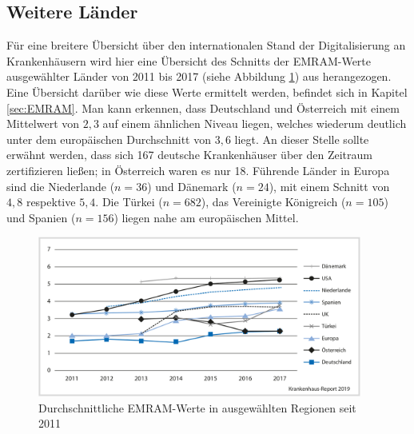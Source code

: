 \subsection{Weitere Länder}
Für eine breitere Übersicht über den internationalen Stand der Digitalisierung an Krankenhäusern wird hier eine Übersicht des Schnitts der EMRAM-Werte ausgewählter Länder von 2011 bis 2017 (siehe Abbildung \ref{fig:andere_laender}) aus \cite{Stephani2019} herangezogen. Eine Übersicht darüber wie diese Werte ermittelt werden, befindet sich in Kapitel \ref{sec:EMRAM}. Man kann erkennen, dass Deutschland und Österreich mit einem Mittelwert von $2,3$ auf einem ähnlichen Niveau liegen, welches wiederum deutlich unter dem europäischen Durchschnitt von $3,6$ liegt. An dieser Stelle sollte erwähnt werden, dass sich 167 deutsche Krankenhäuser über den Zeitraum zertifizieren ließen; in Österreich waren es nur 18. Führende Länder in Europa sind die Niederlande ($n=36$) und Dänemark ($n=24$), mit einem Schnitt von $4,8$ respektive $5,4$. Die Türkei ($n=682$), das Vereinigte Königreich ($n=105$) und Spanien ($n=156$) liegen nahe am europäischen Mittel.
\begin{figure}[ht]
	\includegraphics[width=0.95\textwidth]{Bilder/laendervergleich_EMRAM_Stephani_2019.png}
	\caption{Durchschnittliche EMRAM-Werte in ausgewählten Regionen seit 2011 \parencite{Stephani2019}}
	\label{fig:andere_laender}
\end{figure}
